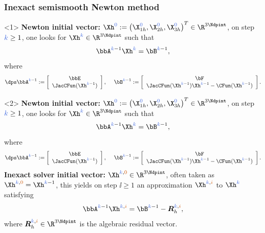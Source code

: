 %
\begin{frame}
\frametitle{Inexact semismooth Newton method}
\begin{onlyenv}<1>
\textcolor{cadmiumgreen}{\textbf{Newton initial vector:}} $\Xh^{\zzero} \egaldef \left(\X_{1h}^{\zzero},\X_{2h}^{\zzero}, \X_{3h}^{\zzero} \right)^{T} \in \R^{3 \Ndpint}$, on step $\kk \geq 1$, one looks for $\Xh^{\kk} \in \R^{3 \Ndpint}$ such that
\begin{equation*}
\bbA^{\kk-1}\Xh^{\kk}=\bB^{\kk-1},
\end{equation*} 
where 
\begin{equation*}
\dps \bbA^{\kk-1}\egaldef
\left[\begin{array}{c}
\bbE \\
\JacCFun(\Xh^{\kk-1})
\end{array}
\right],
\quad  \hspace{0.1 cm} \bB^{\kk-1} \egaldef
\left[\begin{array}{c}
\bF\\
\JacCFun(\Xh^{\kk-1})\Xh^{\kk-1}-\CFun(\Xh^{\kk-1})
\end{array}
\right].
\end{equation*}
\end{onlyenv}
\begin{onlyenv}<2>
\textcolor{cadmiumgreen}{\textbf{Newton initial vector:}} $\Xh^{\zzero} \egaldef \left(\X_{1h}^{\zzero},\X_{2h}^{\zzero}, \X_{3h}^{\zzero} \right)^{T} \in \R^{3 \Ndpint}$, on step $\kk \geq 1$, one looks for $\Xh^{\kk} \in \R^{3 \Ndpint}$ such that
\begin{equation*}
\bbA^{\kk-1}\Xh^{\kk}=\bB^{\kk-1},
\end{equation*} 
where 
\begin{equation*}
\dps \bbA^{\kk-1}\egaldef
\left[\begin{array}{c}
\bbE \\
\JacCFun(\Xh^{\kk-1})
\end{array}
\right],
\quad  \hspace{0.1 cm} \bB^{\kk-1} \egaldef
\left[\begin{array}{c}
\bF\\
\JacCFun(\Xh^{\kk-1})\Xh^{\kk-1}-\CFun(\Xh^{\kk-1})
\end{array}
\right].
\end{equation*}
\textcolor{cadmiumgreen}{\textbf{Inexact solver initial vector:}}
$\Xh^{\kk,\izzero} \in \R^{3 \Ndpint}$, often taken as $\Xh^{\kk,\izzero} = \Xh^{\kk-1}$, this yields on step $\ii \geq
1$ an approximation $\Xh^{\kk,\ii}$ to $\Xh^{\kk}$ satisfying
\begin{equation*}
\bbA^{\kk-1}\Xh^{\kk,\ii} =\bB^{\kk-1}-{\bm R}_h^{\kk,\ii},
\end{equation*}
where ${\bm R}_h^{\kk,\ii} \in \R^{3 \Ndpint}$ is the algebraic residual vector.
\end{onlyenv}


\end{frame}

